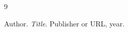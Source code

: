 \renewcommand{\bibname}{References}

\begin{thebibliography}{9}

Author.
\emph{Title}.
Publisher or URL, year.

\end{thebibliography}
